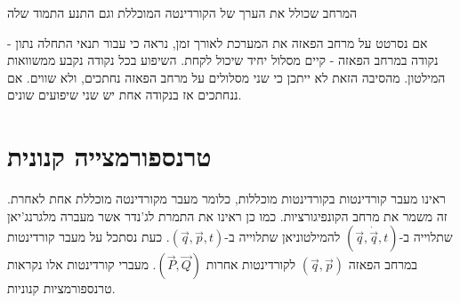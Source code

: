 \documentclass{tstextbook}
\begin{document}
\begin{definition}
המרחב שכולל את הערך של הקורדינטה המוכללת וגם התנע התמוד שלה

\end{definition}
אם נסרטט על מרחב הפאזה את המערכת לאורך זמן, נראה כי עבור תנאי התחלה נתון - נקודה במרחב הפאזה - קיים מסלול יחיד שיכול לקחת. השיפוע בכל נקודה נקבע ממשוואות המילטון. מהסיבה הזאת לא ייתכן כי שני מסלולים על מרחב הפאזה נחתכים, ולא שווים. אם ננחתכים אז בנקודה אחת יש שני שיפועים שונים.

\section{טרנספורמצייה קנונית}

ראינו מעבר קורדינטות בקורדינטות מוכללות, כלומר מעבר מקורדינטה מוכללת אחת לאחרת. זה משמר את מרחב הקונפיגורציות. כמו כן ראינו את התמרת לג'נדר אשר מעברה מלגרנג'יאן שתלוייה ב-\(\left( \vec{q},\dot{\vec{q}},t \right)\) להמילטוניאן שתלוייה ב-\(\left( \vec{q},\vec{p},t \right)\). כעת נסתכל על מעבר קורדינטות במרחב הפאזה \(\left( \vec{q},\vec{p} \right)\) לקורדינטות אחרות \(\left( \vec{P},\vec{Q} \right)\). מעברי קורדינטות אלו נקראות טרנספורמציות קנוניות. 
\end{document}
